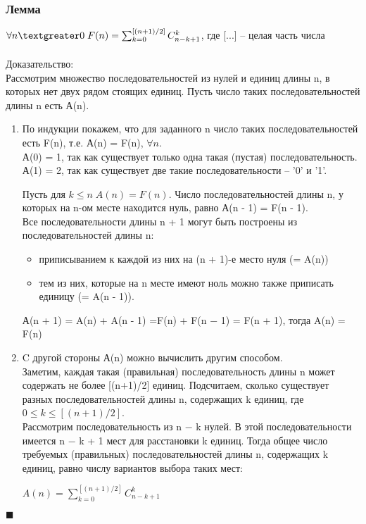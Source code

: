         \subsubsection{Лемма}
        $\forall n \textgreater 0\; F(n) = \sum_{k = 0}^{[(n + 1)/2]} C_{n-k+1}^{k}$, где [...] -- целая часть числа\\
        \\Доказательство:\\ 
        Рассмотрим множество последовательностей из нулей и единиц длины n, в которых нет двух рядом стоящих единиц. Пусть число таких последовательностей длины n есть А(n).
        \begin{enumerate}
            \item По индукции покажем, что для заданного n число таких последовательностей есть F(n), т.е. А(n) = F(n), $\forall n$.\\
            А(0) = 1, так как существует только одна такая (пустая) последовательность.\\
            А(1) = 2, так как существует две такие последовательности -- '0' и '1'. 
            
            Пусть для $k \leq n\; A(n) = F(n)$. Число последовательностей длины n, у которых на n-ом месте находится нуль, равно А(n - 1) = F(n - 1).\\
            Все последовательности длины n + 1 могут быть построены из последовательностей длины n:
            \begin{itemize}
                \item приписыванием к каждой из них на (n + 1)-е место нуля (= A(n))
                \item тем из них, которые на n месте имеют ноль можно также приписать единицу (= A(n - 1)).
            \end{itemize}
            
            А(n + 1) = A(n) + A(n - 1) =F(n) + F(n − 1) = F(n + 1), тогда A(n) = F(n) 
            
            \item C другой стороны А(n) можно вычислить другим способом.\\
            Заметим, каждая такая (правильная) последовательность длины n может содержать не более [(n+1)/2] единиц. Подсчитаем, сколько существует разных последовательностей длины n, содержащих k единиц, где $0 \leq k \leq [(n + 1)/2]$. \\
            Рассмотрим последовательность из n − k нулей. В этой последовательности имеется n − k + 1 мест для расстановки k единиц. Тогда общее число требуемых (правильных) последовательностей длины n, содержащих k единиц, равно числу вариантов выбора таких мест:
            
            $A(n) = \sum_{k = 0}^{[(n + 1)/2]} C_{n-k+1}^{k}$
        \end{enumerate}
        \begin{flushright}
            $\blacksquare$\\
        \end{flushright}
        
